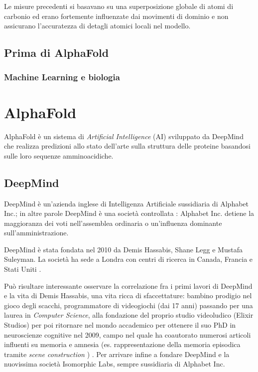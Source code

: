 Le misure precedenti si basavano su una superposizione globale di atomi di carbonio ed erano fortemente influenzate dai movimenti di dominio e non assicurano l'accuratezza di detagli atomici locali nel modello.

\section{Prima di AlphaFold}

\subsection{Machine Learning e biologia}

\chapter{AlphaFold}
AlphaFold è un sistema di \textit{Artificial Intelligence }(AI) sviluppato da DeepMind che realizza predizioni allo stato dell'arte sulla struttura delle proteine basandosi sulle loro sequenze amminoacidiche.

\section{DeepMind}

DeepMind è un'azienda inglese di Intelligenza Artificiale sussidiaria di Alphabet Inc.; in altre parole DeepMind è una società controllata \cite{societaControllataWiki}: Alphabet Inc. detiene la maggioranza dei voti nell'assemblea ordinaria o un'influenza dominante sull'amministrazione.

\par DeepMind è stata fondata nel 2010 da Demis Hassabis, Shane Legg e Mustafa Suleyman. La società ha sede a Londra con centri di ricerca in Canada, Francia e Stati Uniti \cite{deepMindWiki}.

Può risultare interessante osservare la correlazione fra i primi lavori di DeepMind e la vita di Demis Hassabis, una vita ricca di sfaccettature: bambino prodigio nel gioco degli scacchi, programmatore di videogiochi (dai 17 anni) passando per una laurea in \textit{Computer Science}, alla fondazione del proprio studio videoludico (Elixir Studios) per poi ritornare nel mondo accademico per ottenere il suo PhD in neuroscienze cognitive nel 2009, campo nel quale ha coautorato numerosi articoli influenti su memoria e amnesia (es. rappresentazione della memoria episodica tramite \textit{scene construction} \cite{Hassabis2007Jul}) \cite{hassabisWiki}. Per arrivare infine a fondare DeepMind e la nuovissima società Isomorphic Labs, sempre sussidiaria di Alphabet Inc.

